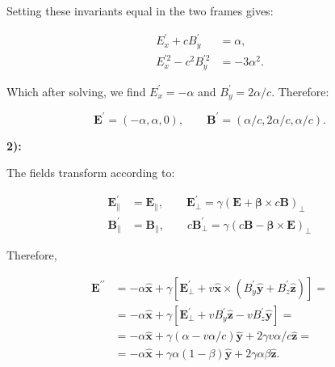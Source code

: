 Setting these invariants equal in the two frames gives:

\begin{equation}
	\begin{split}
		E_{x}^{\prime}+c B_{y}^{\prime} &=\alpha, \\
		E_{x}^{\prime 2}-c^{2} B_{y}^{\prime 2} &=-3 \alpha^{2}.
	\end{split}
\end{equation}

Which after solving, we find $E_{x}^{\prime}=-\alpha$ and $B_{y}^{\prime}=2 \alpha / c .$ Therefore:

\begin{equation}
	\mathbf{E}^{\prime}=(-\alpha, \alpha, 0),\quad\quad \mathbf{B}^{\prime}=(\alpha / c, 2 \alpha / c, \alpha / c) .
\end{equation}

\textbf{2):}
	
The fields transform according to:

\begin{equation}
	\begin{split}
		\mathbf{E}_{\|}^{\prime}&=\mathbf{E}_{\|}, \quad\quad \mathbf{E}_{\perp}^{\prime}=\gamma(\mathbf{E}+\boldsymbol{\beta} \times c \mathbf{B})_{\perp}\\
		\mathbf{B}_{\|}^{\prime}&=\mathbf{B}_{\|}, \quad \quad c \mathbf{B}_{\perp}^{\prime}=\gamma(c \mathbf{B}-\boldsymbol{\beta} \times \mathbf{E})_{\perp}
	\end{split}
\end{equation}

Therefore,
	
\begin{equation}
	\begin{split}
		\mathbf{E}^{\prime \prime} &=-\alpha \hat{\mathbf{x}}+\gamma\left[\mathbf{E}_{\perp}^{\prime}+v \hat{\mathbf{x}} \times\left(B_{y}^{\prime} \hat{\mathbf{y}}+B_{z}^{\prime} \hat{\mathbf{z}}\right)\right] =\\ 
		&=-\alpha \hat{\mathbf{x}}+\gamma\left[\mathbf{E}_{\perp}^{\prime}+v B_{y}^{\prime} \hat{\mathbf{z}}-v B_{z}^{\prime} \hat{\mathbf{y}}\right] =\\ &=-\alpha \hat{\mathbf{x}}+\gamma(\alpha-v \alpha / c) \hat{\mathbf{y}}+2 \gamma v \alpha / c \hat{\mathbf{z}} =\\ &=-\alpha \hat{\mathbf{x}}+\gamma \alpha(1-\beta) \hat{\mathbf{y}}+2 \gamma \alpha \beta \hat{\mathbf{z}}.
	\end{split}
\end{equation}

